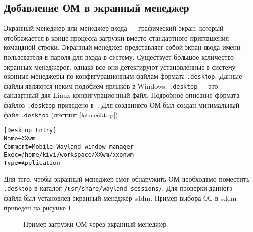 \subsection{Добавление ОМ в экранный менеджер}
Экранный менеджер или менеджер входа --- графический экран, который отображается в конце процесса загрузки вместо стандартного приглашения командной строки. Экранный менеджер представляет собой экран ввода имени пользователя и пароля для входа в систему. Существует большое количество экранных менеджеров, однако все они детектируют установленные в систему оконные менеджеры по конфигурационным файлам формата \texttt{.desktop}. Данные файлы являются неким подобием ярлыков в Windows. \texttt{.desktop} --- это сандартный для Linux конфигурационный файл. Подробное описание формата файлов \texttt{.desktop} приведено в~\cite{desktop}. Для созданного ОМ был создан минимальный файл \texttt{.desktop} (листинг \ref{lst:desktop}).
\begin{lstlisting}[label=lst:desktop, caption={Файл .desktop для ОМ}]
[Desktop Entry]
Name=XXwm
Comment=Mobile Wayland window manager
Exec=/home/kivi/workspace/XXwm/xxonwm
Type=Application
\end{lstlisting}

Для того, чтобы экранный менеджер смог обнаружить ОМ необходимо поместить \texttt{.desktop} в каталог \texttt{/usr/share/wayland-sessions/}. Для проверки данного файла был установлен экранный менеджер sddm. Пример выбора ОС в sddm приведен на рисунке \ref{fig:sddm}.
\begin{figure}[h!]
\caption{Пример загрузки ОМ через экранный менеджер}
\label{fig:sddm}
\end{figure}